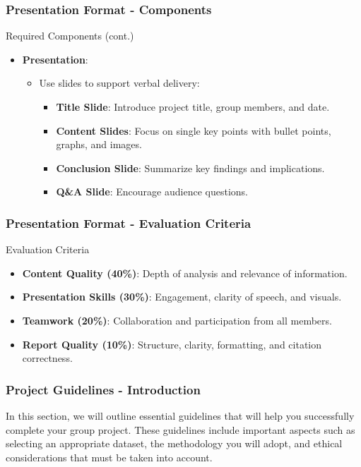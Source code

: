 \documentclass{beamer}
\begin{document}
\begin{frame}[fragile]
    \frametitle{Presentation Format - Components}
    \begin{block}{Required Components (cont.)}
        \begin{itemize}
            \item \textbf{Presentation}: 
            \begin{itemize}
                \item Use slides to support verbal delivery:
                \begin{itemize}
                    \item \textbf{Title Slide}: Introduce project title, group members, and date.
                    \item \textbf{Content Slides}: Focus on single key points with bullet points, graphs, and images.
                    \item \textbf{Conclusion Slide}: Summarize key findings and implications.
                    \item \textbf{Q\&A Slide}: Encourage audience questions.
                \end{itemize}
            \end{itemize}
        \end{itemize}
    \end{block}
\end{frame}

\begin{frame}[fragile]
    \frametitle{Presentation Format - Evaluation Criteria}
    \begin{block}{Evaluation Criteria}
        \begin{itemize}
            \item \textbf{Content Quality (40\%)}: Depth of analysis and relevance of information.
            \item \textbf{Presentation Skills (30\%)}: Engagement, clarity of speech, and visuals.
            \item \textbf{Teamwork (20\%)}: Collaboration and participation from all members.
            \item \textbf{Report Quality (10\%)}: Structure, clarity, formatting, and citation correctness.
        \end{itemize}
    \end{block}
\end{frame}

\begin{frame}[fragile]
    \frametitle{Project Guidelines - Introduction}
    In this section, we will outline essential guidelines that will help you successfully complete your group project. These guidelines include important aspects such as selecting an appropriate dataset, the methodology you will adopt, and ethical considerations that must be taken into account.
\end{frame}
\end{document}
